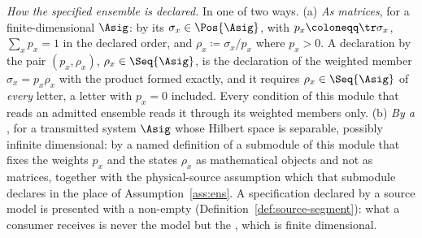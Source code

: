 \begin{definition}
\emph{How the specified ensemble is declared.} In one of two ways.
(a) \emph{As matrices}, for a finite-dimensional $\Asig$: by its
 $\sigma_x\in\Pos{\Asig}$, with
$p_x\coloneqq\tr\sigma_x$, $\sum_xp_x=1$ in the declared order, and
$\rho_x\coloneqq\sigma_x/p_x$ where $p_x>0$. A declaration by the pair
$(p_x,\rho_x)$, $\rho_x\in\Seq{\Asig}$, is the declaration of the weighted
member $\sigma_x=p_x\rho_x$ with the product formed exactly, and it requires
$\rho_x\in\Seq{\Asig}$ of \emph{every} letter, a letter with $p_x=0$
included. Every condition of this module that reads an admitted ensemble
reads it through its weighted members only.
(b) \emph{By a} , for a transmitted system $\Asig$ whose
Hilbert space is separable, possibly infinite dimensional: by a named
definition of a submodule of this module that fixes the weights $p_x$ and the
states $\rho_x$ as mathematical objects and not as matrices, together with
the physical-source assumption which that submodule declares in the place of
Assumption~\ref{ass:ens}. A specification declared by a source model is
presented with a non-empty 
(Definition~\ref{def:source-segment}): what a consumer receives is never the
model but the , which is finite dimensional.


\end{definition}
